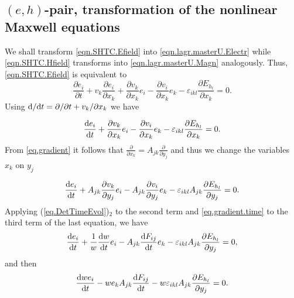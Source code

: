 \documentclass[twoside]{article}
\newcommand{\ted}{E} %
\newcommand{\pd}{\partial}
\newcommand{\rmd}{{\rm d}}
\begin{document}
\subsection{$ (e,h) $-pair, transformation of the nonlinear Maxwell equations} 
\label{sec.app.elmag}

We shall transform \eqref{eqn.SHTC.Efield} into \eqref{eqn.lagr.masterU.Electr} 
while \eqref{eqn.SHTC.Hfield} transforms into \eqref{eqn.lagr.masterU.Magn} 
analogously. Thus, \eqref{eqn.SHTC.Efield} is equivalent to
\begin{equation}
\frac{\pd  e_i}{\pd  t}+v_k\frac{\pd e_i}{\pd  
x_k}+\frac{\pd v_k}{\pd  x_k} e_i-\frac{\pd
v_i}{\pd  x_k}e_k-\varepsilon _{{ikl}}\frac{\pd \ted_{h_l}}{\pd  
x_k}=0.
\end{equation}
Using \(\rmd/{\rmd t}=\pd /\pd t+v_k /\pd x_k\) we have

\begin{equation}
\frac{\rmd e_i}{{\rmd t}}+\frac{\pd v_k}{\pd  x_k} e_i-\frac{\pd 
v_i}{\pd  x_k}e_k-\varepsilon
_{{ikl}}\frac{\pd \ted_{h_l}}{\pd  x_k}=0.
\end{equation}
From \eqref{eq.gradient} it follows that $\frac{\pd}{\pd 
x_k}=A_{{jk}}\frac{\pd}{\pd y_j}$ and thus we change the variables $ x_k $ on $ 
y_j $

\begin{equation}
\frac{\rmd e_i}{{\rmd t}}+A_{{jk}}\frac{\pd v_k}{\pd  y_j} 
e_i-A_{{jk}}\frac{\pd v_i}{\pd  
y_j}e_k-\varepsilon_{{ikl}}A_{{jk}}\frac{\pd \ted_{h_l}}{\pd  y_j}=0.
\end{equation}
Applying (\ref{eq.DetTimeEvol})$_2$ to the second term and 
\eqref{eq.gradient.time} to the third term of the last equation, we have
\begin{equation}
\frac{\rmd e_i}{{\rmd t}}+\frac{1}{w}\frac{{\rmd w}}{{\rmd t}} 
e_i-A_{{jk}}\frac{\rmd F_{ij}}{\rmd 
t}e_k-\varepsilon_{{ikl}}A_{{jk}}\frac{\pd \ted_{h_l}}{\pd  y_j}=0,
\end{equation}
and then
\begin{equation}
\frac{\rmd  w e_i}{{\rmd t}}-w e_k A_{{jk}}\frac{\rmd F_{ij}}{\rmd t}-w 
\varepsilon _{{ikl}}A_{{jk}}\frac{\pd \ted_{h_l}}{\pd  y_j}=0.
\end{equation}
\end{document}
